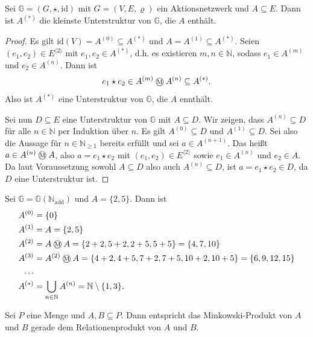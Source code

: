 \documentclass{article}
\newcommand{\mink}{\mathbin{
  \mathchoice
    {\mbox{\normalsize\textcircled{\scriptsize M}}}
    {\mbox{\normalsize\textcircled{\scriptsize M}}}
    {\mbox{\scriptsize\textcircled{\tiny M}}}
    {\mbox{\tiny\textcircled{\fontsize{3.5}{3.5}\selectfont M}}}
  }
}
\begin{document}
\begin{theorem}
  Sei $\mathbb{G} = (G, \star, \text{id})$ mit $G = (V, E, \varrho)$ ein Aktionsnetzwerk
  und $A \subseteq E$.
  Dann ist $A^{(\ast)}$ die kleinste Unterstruktur von $\mathbb{G}$, die $A$ enthält.
\end{theorem}
\begin{proof}
  Es gilt $\text{id}(V) = A^{(0)} \subseteq A^{(\ast)}$ und $A = A^{(1)} \subseteq A^{(\ast)}$.
  Seien $(e_1, e_2) \in E^{\langle 2 \rangle}$ mit $e_1, e_2 \in A^{(\ast)}$, d.h. es existieren $m, n \in \mathbb{N}$,
  sodass $e_1 \in A^{(m)}$ und $e_2 \in A^{(n)}$.
  Dann ist 
  \begin{equation*}
    e_1 \star e_2 \in A^{(m)} \mink A^{(n)} \subseteq A^{(\ast)}.
  \end{equation*}
  Also ist $A^{(\ast)}$ eine Unterstruktur von $\mathbb{G}$,
  die $A$ ennthält.

  Sei nun $D \subseteq E$ eine Unterstruktur von $\mathbb{G}$ mit $A \subseteq D$.
  Wir zeigen, dass $A^{(n)} \subseteq D$ für alle $n \in \mathbb{N}$
  per Induktion über $n$.
  Es gilt $A^{(0)} \subseteq D$ und $A^{(1)} \subseteq D$.
  Sei also die Aussage für $n \in \mathbb{N}_{\geq 1}$ bereits erfüllt
  und sei $a \in A^{(n+1)}$.
  Das heißt $a \in A^{(n)} \mink A$,
  also $a = e_1 \star e_2$ mit $(e_1, e_2) \in E^{\langle 2 \rangle}$
  sowie $e_1 \in A^{(n)}$ und $e_2 \in A$.
  Da laut Voraussetzung sowohl $A \subseteq D$ also auch $A^{(n)} \subseteq D$,
  ist $a = e_1 \star e_2 \in D$, da $D$ eine Unterstruktur ist.
\end{proof}

\begin{example}
  Sei $\mathbb{G} = \mathbb{G}(\mathbb{N}_\text{add})$
  und $A = \{2, 5\}$.
  Dann ist
  \begin{align*}
    A^{(0)} &= \{0\} \\
    A^{(1)} &= A = \{2, 5\} \\
    A^{(2)} &= A \mink A = \{2+2, 5+2, 2+5, 5+5\} = \{4, 7, 10\} \\
    A^{(3)} &= A^{(2)} \mink A = \{4+2, 4+5, 7+2, 7+5, 10+2, 10+5\} = \{6, 9, 12, 15\} \\
    \dots \\
    A^{(\ast)} &= \bigcup_{n \in \mathbb{N}} A^{(n)} = \mathbb{N} \setminus \{1, 3\}.
  \end{align*}
\end{example}

\begin{example}
  Sei $P$ eine Menge und $A, B \subseteq P$.
  Dann entspricht das Minkowski-Produkt von $A$ und $B$ gerade dem Relationenprodukt von $A$ und $B$.
\end{example}
\end{document}
